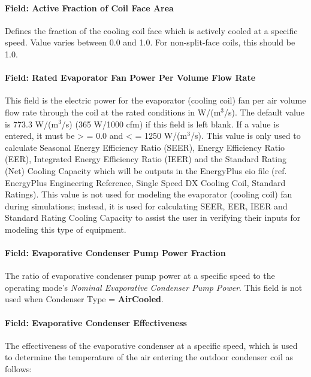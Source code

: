 \paragraph{Field: Active Fraction of Coil Face Area}\label{field-active-fraction-of-coil-face-area}

Defines the fraction of the cooling coil face which is actively cooled at a specific speed. Value varies between 0.0 and 1.0. For non-split-face coils, this should be 1.0.

\paragraph{Field: Rated Evaporator Fan Power Per Volume Flow Rate}

This field is the electric power for the evaporator (cooling coil) fan per air volume flow rate through the coil at the rated conditions in W/(m\(^{3}\)/s). The default value is 773.3 W/(m\(^{3}\)/s) (365 W/1000 cfm) if this field is left blank. If a value is entered, it must be \textgreater{} = 0.0 and \textless{} = 1250 W/(m\(^{3}\)/s). This value is only used to calculate Seasonal Energy Efficiency Ratio (SEER), Energy Efficiency Ratio (EER), Integrated Energy Efficiency Ratio (IEER) and the Standard Rating (Net) Cooling Capacity which will be outputs in the EnergyPlus eio file (ref. EnergyPlus Engineering Reference, Single Speed DX Cooling Coil, Standard Ratings). This value is not used for modeling the evaporator (cooling coil) fan during simulations; instead, it is used for calculating SEER, EER, IEER and Standard Rating Cooling Capacity to assist the user in verifying their inputs for modeling this type of equipment.

\paragraph{Field: Evaporative Condenser Pump Power Fraction}\label{field-evaporative-condenser-pump-power-fraction}

The ratio of evaporative condenser pump power at a specific speed to the operating mode's \textit{Nominal Evaporative Condenser Pump Power}. This field is not used when Condenser Type = \textbf{AirCooled}.

\paragraph{Field: Evaporative Condenser Effectiveness}

The effectiveness of the evaporative condenser at a specific speed, which is used to determine the temperature of the air entering the outdoor condenser coil as follows:

